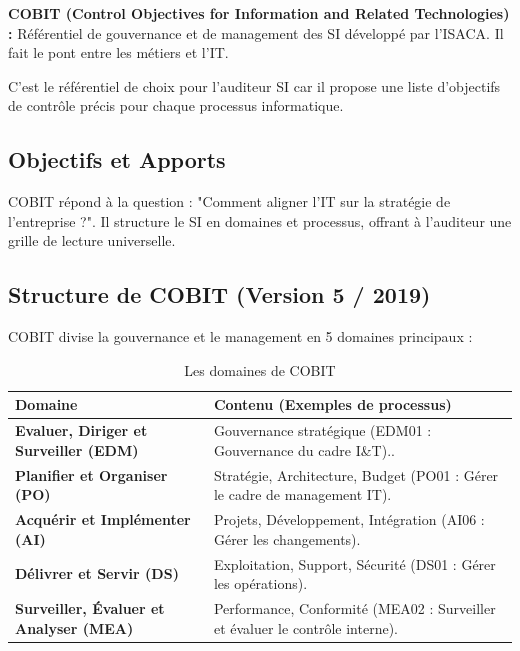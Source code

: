 \begin{boxdef}
\textbf{COBIT (Control Objectives for Information and Related Technologies) :} Référentiel de gouvernance et de management des SI développé par l'ISACA. Il fait le pont entre les métiers et l'IT.
\end{boxdef}

C'est le référentiel de choix pour l'auditeur SI car il propose une liste d'objectifs de contrôle précis pour chaque processus informatique.

\subsection{Objectifs et Apports}

COBIT répond à la question : "Comment aligner l'IT sur la stratégie de l'entreprise ?".
Il structure le SI en domaines et processus, offrant à l'auditeur une grille de lecture universelle.

\subsection{Structure de COBIT (Version 5 / 2019)}

COBIT divise la gouvernance et le management en 5 domaines principaux :

\begin{table}[h!]
\centering
\begin{tabular}{lp{10cm}}
    \toprule
    \textbf{Domaine} & \textbf{Contenu (Exemples de processus)} \\
    \midrule
    \textbf{Evaluer, Diriger et Surveiller (EDM)} & Gouvernance stratégique (EDM01 : Gouvernance du cadre I\&T).. \\
    \midrule
    \textbf{Planifier et Organiser (PO)} & Stratégie, Architecture, Budget (PO01 : Gérer le cadre de management IT). \\
    \midrule
    \textbf{Acquérir et Implémenter (AI)} & Projets, Développement, Intégration (AI06 : Gérer les changements). \\
    \midrule
    \textbf{Délivrer et Servir (DS)} & Exploitation, Support, Sécurité (DS01 : Gérer les opérations). \\
    \midrule
    \textbf{Surveiller, Évaluer et Analyser (MEA)} & Performance, Conformité (MEA02 : Surveiller et évaluer le contrôle interne). \\
    \bottomrule
\end{tabular}
\caption{Les domaines de COBIT}
\end{table}

